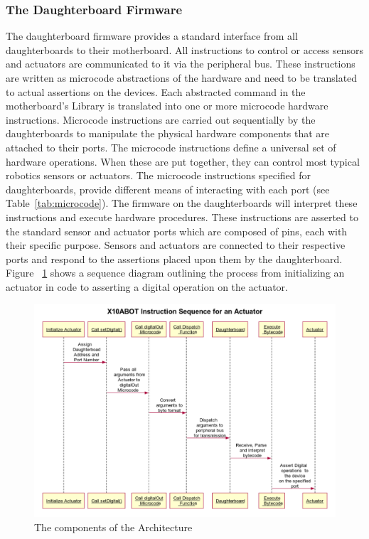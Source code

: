 	\subsubsection{The Daughterboard Firmware} %
	\label{ssub:the_daughterboard_firmware}
	The daughterboard firmware provides a standard interface from all daughterboards to their motherboard. All instructions to control or access sensors and actuators are communicated to it via the peripheral bus. These instructions are written as microcode abstractions of the hardware and need to be translated to actual assertions on the devices. Each abstracted command in the motherboard's \xten Library is translated into one or more microcode hardware instructions. Microcode instructions are carried out sequentially by the daughterboards to manipulate the physical hardware components that are attached to their ports. The microcode instructions define a universal set of hardware operations. When these are put together, they can control most typical robotics sensors or actuators.
		The microcode instructions specified for daughterboards, provide different means of interacting with each port (see Table~\ref{tab:microcode}).
	The firmware on the daughterboards will interpret these instructions and execute hardware procedures. These instructions are asserted to the standard sensor and actuator ports which are composed of pins, each with their specific purpose. Sensors and actuators are connected to their respective ports and respond to the assertions placed upon them by the daughterboard. Figure ~\ref{fig:sequence} shows a sequence diagram outlining the process from initializing an actuator in code to asserting a digital operation on the actuator.

    \begin{figure}[h]
  \begin{center}
    \includegraphics[width=1.0\columnwidth]{Figures/sequence.pdf}
    \caption{The components of the \xten Architecture}
    \label{fig:sequence}
  \end{center}
\end{figure}


